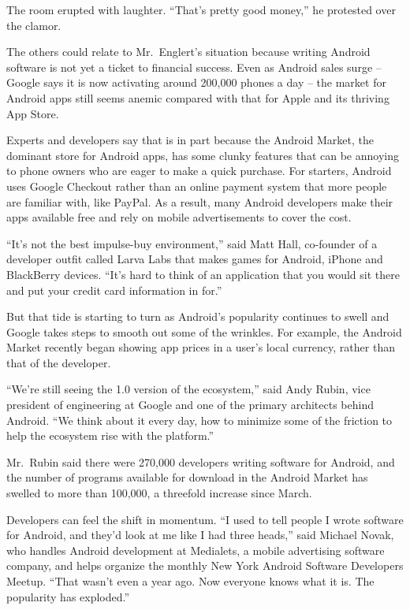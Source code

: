 ﻿\documentclass[12pt]{article}
\begin{document}
The room erupted with laughter. ``That's pretty good money,'' he protested over the clamor.

The others could relate to Mr.~Englert's situation because writing Android software is not yet a
ticket to financial success. Even as Android sales surge -- Google says it is now activating around
200,000 phones a day -- the market for Android apps still seems anemic compared with that for Apple
and its thriving App Store.

Experts and developers say that is in part because the Android Market, the dominant store for
Android apps, has some clunky features that can be annoying to phone owners who are eager to make a
quick purchase. For starters, Android uses Google Checkout rather than an online payment system that
more people are familiar with, like PayPal. As a result, many Android developers make their apps
available free and rely on mobile advertisements to cover the cost.

``It's not the best impulse-buy environment,'' said Matt Hall, co-founder of a developer outfit
called Larva Labs that makes games for Android, iPhone and BlackBerry devices. ``It's hard to think
of an application that you would sit there and put your credit card information in for.''

But that tide is starting to turn as Android's popularity continues to swell and Google takes steps
to smooth out some of the wrinkles. For example, the Android Market recently began showing app
prices in a user's local currency, rather than that of the developer.

``We're still seeing the 1.0 version of the ecosystem,'' said Andy Rubin, vice president of
engineering at Google and one of the primary architects behind Android. ``We think about it every
day, how to minimize some of the friction to help the ecosystem rise with the platform.''

Mr.~Rubin said there were 270,000 developers writing software for Android, and the number of
programs available for download in the Android Market has swelled to more than 100,000, a threefold
increase since March.

Developers can feel the shift in momentum. ``I used to tell people I wrote software for Android, and
they'd look at me like I had three heads,'' said Michael Novak, who handles Android development at
Medialets, a mobile advertising software company, and helps organize the monthly New York Android
Software Developers Meetup. ``That wasn't even a year ago. Now everyone knows what it is. The
popularity has exploded.''
\end{document}
